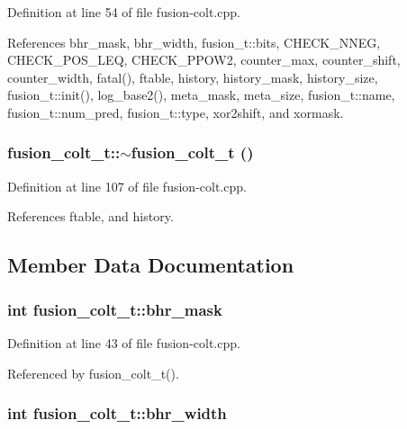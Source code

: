 Definition at line 54 of file fusion-colt.cpp.

References bhr\_\-mask, bhr\_\-width, fusion\_\-t::bits, CHECK\_\-NNEG, CHECK\_\-POS\_\-LEQ, CHECK\_\-PPOW2, counter\_\-max, counter\_\-shift, counter\_\-width, fatal(), ftable, history, history\_\-mask, history\_\-size, fusion\_\-t::init(), log\_\-base2(), meta\_\-mask, meta\_\-size, fusion\_\-t::name, fusion\_\-t::num\_\-pred, fusion\_\-t::type, xor2shift, and xormask.
\subsubsection[{$\sim$fusion\_\-colt\_\-t}]{\setlength{\rightskip}{0pt plus 5cm}fusion\_\-colt\_\-t::$\sim$fusion\_\-colt\_\-t ()\hspace{0.3cm}{\tt  [inline]}}\label{classfusion__colt__t_796c11c1684243ac88655aea45d346be}




Definition at line 107 of file fusion-colt.cpp.

References ftable, and history.

\subsection{Member Data Documentation}
\subsubsection[{bhr\_\-mask}]{\setlength{\rightskip}{0pt plus 5cm}int {\bf fusion\_\-colt\_\-t::bhr\_\-mask}\hspace{0.3cm}{\tt  [protected]}}\label{classfusion__colt__t_8754e20fad808d396d3f472a67045576}




Definition at line 43 of file fusion-colt.cpp.

Referenced by fusion\_\-colt\_\-t().
\subsubsection[{bhr\_\-width}]{\setlength{\rightskip}{0pt plus 5cm}int {\bf fusion\_\-colt\_\-t::bhr\_\-width}\hspace{0.3cm}{\tt  [protected]}}\label{classfusion__colt__t_d5176d6026c3fb5b65c45256e479e0d3}





